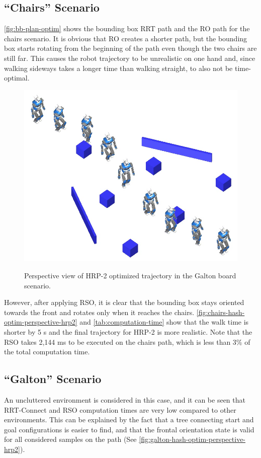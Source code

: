 \subsection{``Chairs'' Scenario}
\autoref{fig:bb-plan-optim} shows the bounding box RRT path
and the RO path for the chairs scenario. It is obvious that RO creates
a shorter path, but the bounding box starts rotating from the
beginning of the path even though the two chairs are still far. This
causes the robot trajectory to be unrealistic on one hand and, since
walking sideways takes a longer time than walking straight, to also
not be time-optimal.

\begin{figure}
  \centering
      {\includegraphics[width = \linewidth]
        {src/chap1-path-optimization/galton-hash-optim-perspective-hrp2.png}}
      \caption{Perspective view of HRP-2 optimized trajectory in the
        Galton board scenario.}
      \label{fig:galton-hash-optim-perspective-hrp2}
\end{figure}

However, after applying RSO, it is clear that the bounding box stays
oriented towards the front and rotates only when it reaches the
chairs. \autoref{fig:chairs-hash-optim-perspective-hrp2} and
\autoref{tab:computation-time} show that the walk time is shorter by 5
s and the final trajectory for HRP-2 is more realistic. Note that the
RSO takes 2,144 ms to be executed on the chairs path, which is less
than 3\% of the total computation time.

\subsection{``Galton'' Scenario}
An uncluttered environment is considered in this case, and
it can be seen that RRT-Connect and RSO computation times are very low
compared to other environments. This can be explained by the fact that
a tree connecting start and goal configurations is easier to find, and
that the frontal orientation state is valid for all considered samples
on the path (See \autoref{fig:galton-hash-optim-perspective-hrp2}).

